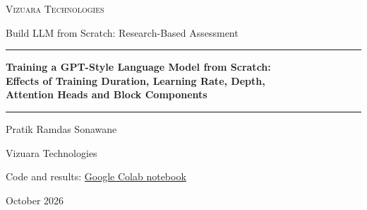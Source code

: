 \documentclass[11pt,a4paper]{article}
\newcommand{\colaburl}{https://colab.research.google.com/drive/1zfz-atgfb0Z72t7IwxTM5HA-_C3_LFRG?usp=sharing}
\begin{document}
\begin{titlepage}
  \centering
  \vspace*{1.5cm}
  {\large\textsc{Vizuara Technologies}\par}
  \vspace{0.3cm}
  {\normalsize Build LLM from Scratch: Research-Based Assessment\par}
  \vspace{2.2cm}
  \rule{\linewidth}{0.6pt}\par\vspace{0.5cm}
  {\LARGE\bfseries Training a GPT-Style Language Model from Scratch:\\[0.25cm]
  \Large Effects of Training Duration, Learning Rate, Depth,\\ Attention Heads and Block Components\par}
  \vspace{0.4cm}\rule{\linewidth}{0.6pt}\par
  \vspace{2cm}
  {\Large Pratik Ramdas Sonawane\par}
  \vspace{0.3cm}
  {\large Vizuara Technologies\par}
  \vspace{1.2cm}
  {\normalsize Code and results: \href{\colaburl}{Google Colab notebook}\par}
  \vfill
  {\large October 2026\par}
\end{titlepage}
\end{document}

